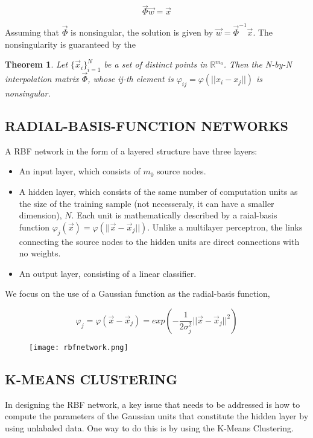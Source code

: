 \documentclass{article}
\newtheorem{theorem}{Theorem}[section]
\begin{document}
$$ \vec{\Phi} \vec{w} = \vec{x} $$

Assuming that $ \vec{\Phi} $ is nonsingular, the solution is given by $ \vec{w} = \vec{\Phi}^{-1} \vec{x} $. The nonsingularity is guaranteed by the

\begin{theorem}
	Let $ \{ \vec{x}_{i} \}_{i = 1}^{N} $ be a set of distinct points in $ \mathbb{R}^{m_{0}} $. Then the N-by-N interpolation matrix $ \vec{\Phi} $, whose ij-th element is $ \varphi_{ij} = \varphi ( || x_{i} - x_{j} ||)$ is nonsingular.
\end{theorem}

\subsection{RADIAL-BASIS-FUNCTION NETWORKS}

A RBF network in the form of a layered structure have three layers:

\begin{itemize}
	\item An input layer, which consists of $ m_{0} $ source nodes.
	\item A hidden layer, which consists of the same number of computation units as the size of the training sample (not necesseraly, it can have a smaller dimension), $ N $. Each unit is mathematically described by a raial-basis function $ \varphi_{j} ( \vec{x} ) = \varphi ( || \vec{x} - \vec{x}_{j}||) $. Unlike a multilayer perceptron, the links connecting the source nodes to the hidden units are direct connections with no weights.
	\item An output layer, consisting of a linear classifier.
\end{itemize}

We focus on the use of a Gaussian function as the radial-basis function,

$$ \varphi_{j} = \varphi ( \vec{x} - \vec{x}_{j}) = exp (- \dfrac{1}{2\sigma_{j}^{2}} || \vec{x} - \vec{x}_{j}||^{2}) $$

\begin{figure}
	\center
	\texttt{[image: rbfnetwork.png]}
	\caption{}
	\label{fig:rbfnetwork}			
\end{figure}

\subsection{K-MEANS CLUSTERING}

In designing the RBF network, a key issue that needs to be addressed is how to compute the parameters of the Gaussian units that constitute the hidden layer by using unlabaled data. One way to do this is by using the K-Means Clustering.
\end{document}
